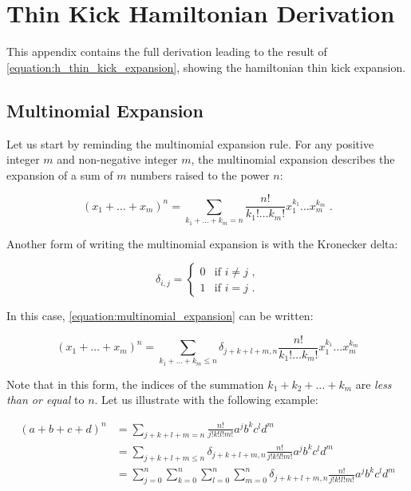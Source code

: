 \chapter{Thin Kick Hamiltonian Derivation}
\label{appendix:hamiltonian_derivation}

This appendix contains the full derivation leading to the result of \cref{equation:h_thin_kick_expansion}, showing the hamiltonian thin kick expansion.

\section{Multinomial Expansion}
\label{section:multinomial_expansion}

Let us start by reminding the multinomial expansion rule.
For any positive integer \(m\) and non-negative integer \(m\), the multinomial expansion describes the expansion of a sum of \(m\) numbers raised to the power \(n\):

\begin{equation}
    (x_1 + \ldots + x_m)^n = \sum_{k_1 + \ldots + k_m = n} \frac{n!}{k_1! \ldots k_m!} x_1^{k_1} \ldots x_m^{k_m} \text{ .}
    \label{equation:multinomial_expansion}
\end{equation}

Another form of writing the multinomial expansion is with the Kronecker delta:

\begin{equation}
    \delta_{i,j} = 
        \begin{cases} 
            0 & \text{if } i \neq j \text{ ,} \\
            1 & \text{if } i = j \text{ .}
        \end{cases}
    \label{equation:kronecker_delta}
\end{equation}

In this case, \cref{equation:multinomial_expansion} can be written:

\begin{equation}
    (x_1 + \ldots + x_m)^n = \sum_{k_1 + \ldots + k_m \leq n} \delta_{j + k + l + m, n} \frac{n!}{k_1! \ldots k_m!} x_1^{k_1} \ldots x_m^{k_m}
    \label{equation:multinomial_expansion_kronecker}
\end{equation}

Note that in this form, the indices of the summation \(k_1 + k_2 + \ldots + k_m\) are \emph{less than or equal} to \(n\).
Let us illustrate with the following example:

\begin{equation}
    \begin{aligned}
    (a + b + c + d)^n &= \sum_{j + k + l + m = n}  \frac{n!}{j! k! l! m!} a^j b^k c^l d^m  \\
                      &= \sum_{j + k + l + m \leq n} \delta_{j + k + l + m, n} \frac{n!}{j! k! l! m!} a^j b^k c^l d^m  \\
                      &= \sum^n_{j=0} \sum^n_{k=0} \sum^n_{l=0} \sum^n_{m=0} \delta_{j + k + l + m, n} \frac{n!}{j! k! l! m!} a^j b^k c^l d^m
    \end{aligned}
\end{equation}

